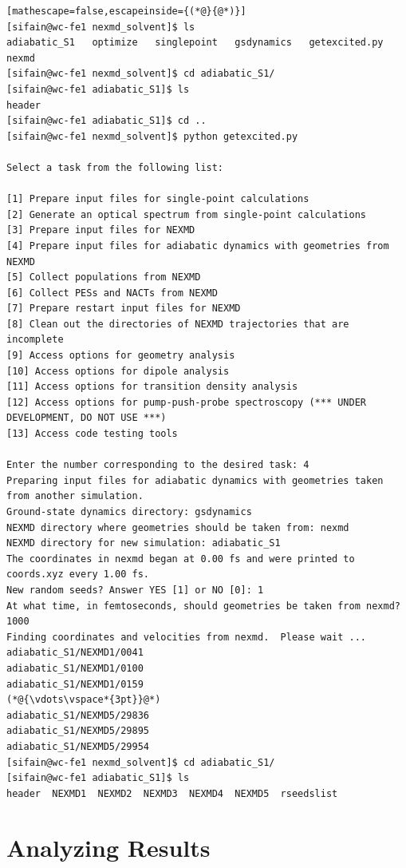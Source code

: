 \documentclass[letterpaper,12pt,titlepage]{article}
\begin{document}
\begin{lstlisting}[mathescape=false,escapeinside={(*@}{@*)}]
[sifain@wc-fe1 nexmd_solvent]$ ls
adiabatic_S1   optimize   singlepoint   gsdynamics   getexcited.py   nexmd
[sifain@wc-fe1 nexmd_solvent]$ cd adiabatic_S1/
[sifain@wc-fe1 adiabatic_S1]$ ls
header
[sifain@wc-fe1 adiabatic_S1]$ cd ..
[sifain@wc-fe1 nexmd_solvent]$ python getexcited.py 

Select a task from the following list:

[1] Prepare input files for single-point calculations
[2] Generate an optical spectrum from single-point calculations
[3] Prepare input files for NEXMD
[4] Prepare input files for adiabatic dynamics with geometries from NEXMD
[5] Collect populations from NEXMD
[6] Collect PESs and NACTs from NEXMD
[7] Prepare restart input files for NEXMD
[8] Clean out the directories of NEXMD trajectories that are incomplete
[9] Access options for geometry analysis
[10] Access options for dipole analysis
[11] Access options for transition density analysis
[12] Access options for pump-push-probe spectroscopy (*** UNDER DEVELOPMENT, DO NOT USE ***)
[13] Access code testing tools

Enter the number corresponding to the desired task: 4
Preparing input files for adiabatic dynamics with geometries taken from another simulation.
Ground-state dynamics directory: gsdynamics
NEXMD directory where geometries should be taken from: nexmd
NEXMD directory for new simulation: adiabatic_S1
The coordinates in nexmd began at 0.00 fs and were printed to coords.xyz every 1.00 fs.
New random seeds? Answer YES [1] or NO [0]: 1
At what time, in femtoseconds, should geometries be taken from nexmd? 1000
Finding coordinates and velocities from nexmd.  Please wait ...
adiabatic_S1/NEXMD1/0041
adiabatic_S1/NEXMD1/0100
adiabatic_S1/NEXMD1/0159
(*@{\vdots\vspace*{3pt}}@*)
adiabatic_S1/NEXMD5/29836
adiabatic_S1/NEXMD5/29895
adiabatic_S1/NEXMD5/29954
[sifain@wc-fe1 nexmd_solvent]$ cd adiabatic_S1/
[sifain@wc-fe1 adiabatic_S1]$ ls
header  NEXMD1  NEXMD2  NEXMD3  NEXMD4  NEXMD5  rseedslist
\end{lstlisting}

\newpage
\section{Analyzing Results}
\end{document}
